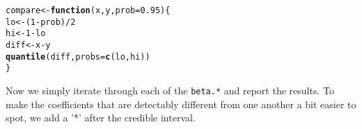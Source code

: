 \documentclass[12pt]{article}\usepackage[]{graphicx}\usepackage[]{color}
\makeatletter
\newcommand{\hlnum}[1]{\textcolor[rgb]{0.686,0.059,0.569}{#1}}%
\newcommand{\hlopt}[1]{\textcolor[rgb]{0,0,0}{#1}}%
\newcommand{\hlstd}[1]{\textcolor[rgb]{0.345,0.345,0.345}{#1}}%
\newcommand{\hlkwa}[1]{\textcolor[rgb]{0.161,0.373,0.58}{\textbf{#1}}}%
\newcommand{\hlkwb}[1]{\textcolor[rgb]{0.69,0.353,0.396}{#1}}%
\newcommand{\hlkwc}[1]{\textcolor[rgb]{0.333,0.667,0.333}{#1}}%
\newcommand{\hlkwd}[1]{\textcolor[rgb]{0.737,0.353,0.396}{\textbf{#1}}}%
\newenvironment{kframe}{%
 \def\at@end@of@kframe{}%
 \ifinner\ifhmode%
  \def\at@end@of@kframe{\end{minipage}}%
  \begin{minipage}{\columnwidth}%
 \fi\fi%
 \def\FrameCommand##1{\hskip\@totalleftmargin \hskip-\fboxsep
 \colorbox{shadecolor}{##1}\hskip-\fboxsep
     \hskip-\linewidth \hskip-\@totalleftmargin \hskip\columnwidth}%
 \MakeFramed {\advance\hsize-\width
   \@totalleftmargin\z@ \linewidth\hsize
   \@setminipage}}%
 {\par\unskip\endMakeFramed%
 \at@end@of@kframe}
\newenvironment{knitrout}{}{} %
\makeatother
\begin{document}
\begin{knitrout}
\color{fgcolor}\begin{kframe}
\begin{alltt}
\hlstd{compare} \hlkwb{<-} \hlkwa{function}\hlstd{(}\hlkwc{x}\hlstd{,} \hlkwc{y}\hlstd{,} \hlkwc{prob} \hlstd{=} \hlnum{0.95}\hlstd{) \{}
  \hlstd{lo} \hlkwb{<-} \hlstd{(}\hlnum{1} \hlopt{-} \hlstd{prob)}\hlopt{/}\hlnum{2}
  \hlstd{hi} \hlkwb{<-} \hlnum{1} \hlopt{-} \hlstd{lo}
  \hlstd{diff} \hlkwb{<-} \hlstd{x} \hlopt{-} \hlstd{y}
  \hlkwd{quantile}\hlstd{(diff,} \hlkwc{probs} \hlstd{=} \hlkwd{c}\hlstd{(lo, hi))}
\hlstd{\}}
\end{alltt}
\end{kframe}
\end{knitrout}

Now we simply iterate through each of the {\tt beta.*} and report the
results. To make the coefficients that are detectably different from
one another a bit easier to spot, we add a '*' after the credible
interval.
\end{document}
